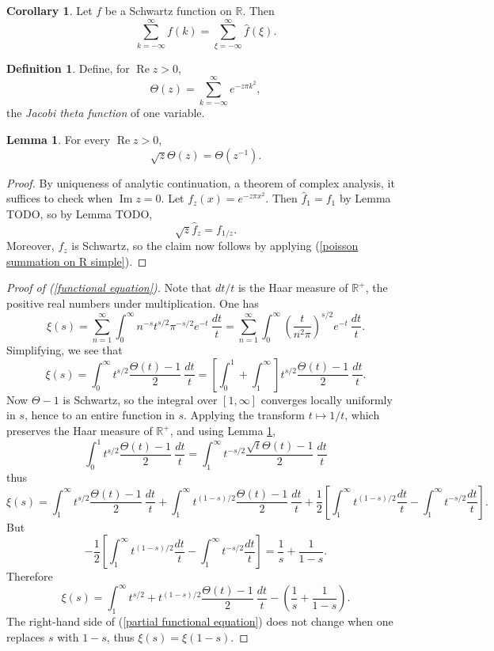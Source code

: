 \documentclass[12pt]{book}
\newcommand{\RR}{\mathbb{R}}
\renewcommand{\Re}{\operatorname{Re}}
\renewcommand{\Im}{\operatorname{Im}}
\newcommand{\dfn}[1]{\emph{#1}\index{#1}}
\theoremstyle{definition}
\newtheorem{lemma}[theorem]{Lemma}
\newtheorem{corollary}[theorem]{Corollary}
\newtheorem{definition}[theorem]{Definition}
\begin{document}
\begin{corollary}
Let $f$ be a Schwartz function on $\RR$. Then
\begin{equation}
\label{poisson summation on R simple}
\sum_{k=-\infty}^\infty f(k) = \sum_{\xi = -\infty}^\infty \hat f(\xi).
\end{equation}
\end{corollary}

\begin{definition}
Define, for $\Re z > 0$,
$$\Theta(z) = \sum_{k=-\infty}^\infty e^{-z\pi k^2},$$
the \dfn{Jacobi theta function} of one variable.
\end{definition}

\begin{lemma}
\label{functional equation of the theta function}
For every $\Re z > 0$,
$$\sqrt z \Theta(z) = \Theta(z^{-1}).$$
\end{lemma}
\begin{proof}
By uniqueness of analytic continuation, a theorem of complex analysis, it suffices to check when $\Im z = 0$. Let $f_z(x) = e^{-z\pi x^2}$. Then $\hat f_1 = f_1$ by Lemma TODO, so by Lemma TODO,
$$\sqrt z \hat f_z = f_{1/z}.$$
Moreover, $f_z$ is Schwartz, so the claim now follows by applying (\ref{poisson summation on R simple}).
\end{proof}

\begin{proof}[Proof of (\ref{functional equation})]
Note that $dt/t$ is the Haar measure of $\RR^+$, the positive real numbers under multiplication. One has
$$\xi(s) = \sum_{n=1}^\infty \int_0^\infty n^{-s} t^{s/2} \pi^{-s/2} e^{-t}~\frac{dt}{t} = \sum_{n=1}^\infty \int_0^\infty \left(\frac{t}{n^2\pi}\right)^{s/2}e^{-t}~\frac{dt}{t}.$$
Simplifying, we see that
$$\xi(s) = \int_0^\infty t^{s/2} \frac{\Theta(t) - 1}{2}~\frac{dt}{t} = \left[\int_0^1 + \int_1^\infty \right]t^{s/2} \frac{\Theta(t) - 1}{2}~\frac{dt}{t}.$$
Now $\Theta - 1$ is Schwartz, so the integral over $[1, \infty]$ converges locally uniformly in $s$, hence to an entire function in $s$.
Applying the transform $t \mapsto 1/t$, which preserves the Haar measure of $\RR^+$, and using Lemma \ref{functional equation of the theta function},
$$\int_0^1 t^{s/2} \frac{\Theta(t) - 1}{2}~\frac{dt}{t} = \int_1^\infty t^{-s/2} \frac{\sqrt t \Theta(t) - 1}{2}~\frac{dt}{t}$$
thus
$$\xi(s) = \int_1^\infty t^{s/2} \frac{\Theta(t) - 1}{2}~\frac{dt}{t} + \int_1^\infty t^{(1-s)/2} \frac{\Theta(t) - 1}{2}~\frac{dt}{t} + \frac{1}{2} \left[\int_1^\infty t^{(1-s)/2} \frac{dt}{t} - \int_1^\infty t^{-s/2}\frac{dt}{t} \right].$$
But
$$-\frac{1}{2} \left[\int_1^\infty t^{(1-s)/2} \frac{dt}{t} - \int_1^\infty t^{-s/2}\frac{dt}{t} \right] = \frac{1}{s} + \frac{1}{1-s}.$$
Therefore
\begin{equation}
\label{partial functional equation}
\xi(s) = \int_1^\infty t^{s/2} + t^{(1-s)/2}\frac{\Theta(t) - 1}{2} ~\frac{dt}{t} - \left(\frac{1}{s} + \frac{1}{1-s}\right).
\end{equation}
The right-hand side of (\ref{partial functional equation}) does not change when one replaces $s$ with $1-s$, thus $\xi(s) = \xi(1-s)$.
\end{proof}
\end{document}
